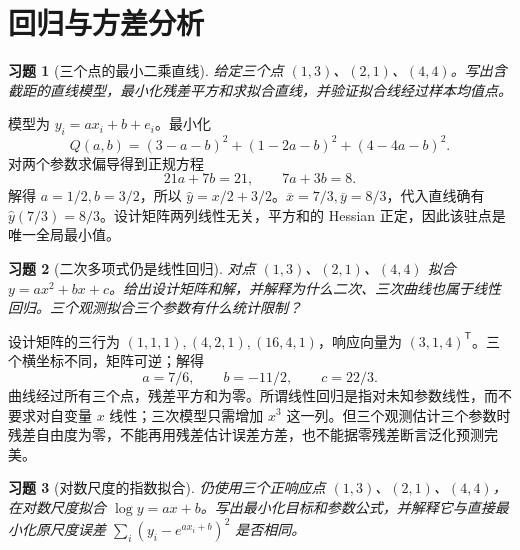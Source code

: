 \documentclass[UTF8,12pt,a4paper,fontset=fandol]{ctexart}
\newtheorem{exercise}{习题}[section]
\begin{document}
\clearpage\section{回归与方差分析}

\begin{exercise}[三个点的最小二乘直线]\label{q:M-C26-1a}
给定三个点 $(1,3)$、$(2,1)$、$(4,4)$。写出含截距的直线模型，最小化残差平方和求拟合直线，并验证拟合线经过样本均值点。\par{}
\end{exercise}

\begin{solve}\label{a:M-C26-1a}模型为 $y_i=a x_i+b+e_i$。最小化\[Q(a,b)=(3-a-b)^2+(1-2a-b)^2+(4-4a-b)^2.\]对两个参数求偏导得到正规方程\[21a+7b=21,\qquad7a+3b=8.\]解得 $a=1/2,b=3/2$，所以 $\widehat y=x/2+3/2$。$\overline x=7/3,\overline y=8/3$，代入直线确有 $\widehat y(7/3)=8/3$。设计矩阵两列线性无关，平方和的 Hessian 正定，因此该驻点是唯一全局最小值。\end{solve}

\begin{exercise}[二次多项式仍是线性回归]\label{q:M-C26-1b}
对点 $(1,3)$、$(2,1)$、$(4,4)$ 拟合 $y=ax^2+bx+c$。给出设计矩阵和解，并解释为什么二次、三次曲线也属于线性回归。三个观测拟合三个参数有什么统计限制？\par{}
\end{exercise}

\begin{solve}\label{a:M-C26-1b}设计矩阵的三行为 $(1,1,1),(4,2,1),(16,4,1)$，响应向量为 $(3,1,4)^\mathsf T$。三个横坐标不同，矩阵可逆；解得\[a=7/6,\qquad b=-11/2,\qquad c=22/3.\]曲线经过所有三个点，残差平方和为零。所谓线性回归是指对未知参数线性，而不要求对自变量 $x$ 线性；三次模型只需增加 $x^3$ 这一列。但三个观测估计三个参数时残差自由度为零，不能再用残差估计误差方差，也不能据零残差断言泛化预测完美。\end{solve}

\begin{exercise}[对数尺度的指数拟合]\label{q:M-C26-1c}
仍使用三个正响应点 $(1,3)$、$(2,1)$、$(4,4)$，在对数尺度拟合 $\log y=ax+b$。写出最小化目标和参数公式，并解释它与直接最小化原尺度误差 $\sum_i(y_i-e^{ax_i+b})^2$ 是否相同。\par{}
\end{exercise}
\end{document}
